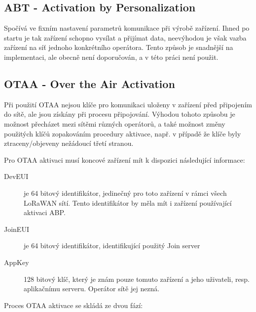     \subsection{ABT - Activation by Personalization}
        \label{par:LoRaWAN_ABP}

        Spočívá ve fixním nastavení parametrů komunikace při výrobě zařízení.
        Ihned po startu je tak zařízení schopno vysílat a přijímat data,
        neevýhodou je však vazba zařízení na síť jednoho konkrétního operátora.
        Tento způsob je snadnější na implementaci, ale obecně není doporučován,
        a v této práci není použit.

    \subsection{OTAA - Over the Air Activation}
        \label{par:LoRaWAN_OTAA}

        Při použití OTAA nejsou klíče pro komunikaci uloženy v zařízení před
        připojením do sítě, ale jsou získány při procesu připojování. Výhodou
        tohoto způsobu je možnost přecházet mezi sítěmi různých operátorů, a
        také možnost změny použitých klíčů zopakováním procedury aktivace,
        např. v případě že klíče byly ztraceny/objeveny nežádoucí třetí stranou.

        Pro OTAA aktivaci musí koncové zařízení mít k dispozici následující 
        informace:

        \begin{description}
            \item [DevEUI]
                je 64 bitový identifikátor, jedinečný pro toto zařízení v rámci
                všech LoRaWAN sítí. Tento identifikátor by měla mít i zařízení
                používající aktivaci ABP.
            \item [JoinEUI]
                je 64 bitový identifikátor, identifikující použitý Join server
            \item [AppKey]
                128 bitový klíč, který je znám pouze tomuto zařízení a jeho
                uživateli, resp. aplikačnímu serveru. Operátor sítě jej nezná.
        \end{description}

        Proces OTAA aktivace se skládá ze dvou fází:

